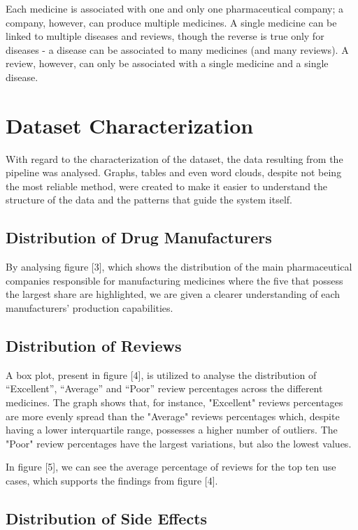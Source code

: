 \documentclass[sigconf]{acmart}
\begin{document}
Each medicine is associated with one and only one pharmaceutical company; a company, however, can produce multiple medicines. A single medicine can be linked to multiple diseases and reviews, though the reverse is true only for diseases - a disease can be associated to many medicines (and many reviews). A review, however, can only be associated with a single medicine and a single disease.

\section{Dataset Characterization}

With regard to the characterization of the dataset, the data resulting from the pipeline was analysed. Graphs, tables and even word clouds, despite not being the most reliable method, were created to make it easier to understand the structure of the data and the patterns that guide the system itself.

\subsection{Distribution of Drug Manufacturers}

By analysing figure [3], which shows the distribution of the main pharmaceutical companies responsible for manufacturing medicines where the five that possess the largest share are highlighted, we are given a clearer understanding of each manufacturers' production capabilities.

\subsection{Distribution of Reviews}

A box plot, present in figure [4], is utilized to analyse the distribution of “Excellent”, “Average” and “Poor” review percentages across the different medicines. The graph shows that, for instance, "Excellent" reviews percentages are more evenly spread than the "Average" reviews percentages which, despite having a lower interquartile range\cite{iqrange}, possesses a higher number of outliers. The "Poor" review percentages have the largest variations, but also the lowest values. 

In figure [5], we can see the average percentage of reviews for the top ten use cases, which supports the findings from figure [4].

\subsection{Distribution of Side Effects}
\end{document}
